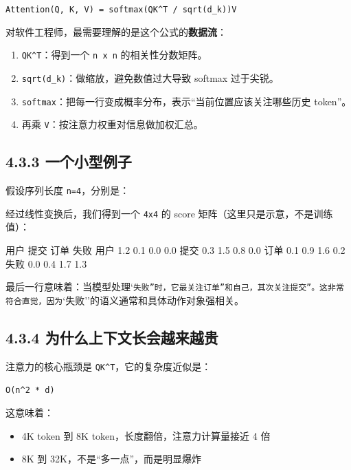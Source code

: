\texttt{Attention(Q, K, V) = softmax(QK\textasciicircum{}T / sqrt(d\_k))V}


对软件工程师，最需要理解的是这个公式的\textbf{数据流}：


\begin{enumerate}[leftmargin=2em]
\item \texttt{QK\textasciicircum{}T}：得到一个 \texttt{n x n} 的相关性分数矩阵。
\item \texttt{sqrt(d\_k)}：做缩放，避免数值过大导致 softmax 过于尖锐。
\item \texttt{softmax}：把每一行变成概率分布，表示``当前位置应该关注哪些历史 token''。
\item 再乘 \texttt{V}：按注意力权重对信息做加权汇总。
\end{enumerate}

\subsection{4.3.3 一个小型例子}

假设序列长度 \texttt{n=4}，分别是：


\begin{codeblock}
["用户", "提交", "订单", "失败"]
\end{codeblock}

经过线性变换后，我们得到一个 \texttt{4x4} 的 score 矩阵（这里只是示意，不是训练值）：


\begin{codeblock}
         用户   提交   订单   失败
用户     1.2   0.1   0.0   0.0
提交     0.3   1.5   0.8   0.0
订单     0.1   0.9   1.6   0.2
失败     0.0   0.4   1.7   1.3
\end{codeblock}

最后一行意味着：当模型处理`\texttt{失败''时，它最关注}\texttt{订单''和自己，其次关注}\texttt{提交''。这非常符合直觉，因为}`失败''的语义通常和具体动作对象强相关。


\subsection{4.3.4 为什么上下文长会越来越贵}

注意力的核心瓶颈是 \texttt{QK\textasciicircum{}T}，它的复杂度近似是：


\texttt{O(n\textasciicircum{}2 * d)}


这意味着：


\begin{itemize}[leftmargin=2em]
\item 4K token 到 8K token，长度翻倍，注意力计算量接近 4 倍
\item 8K 到 32K，不是``多一点''，而是明显爆炸
\end{itemize}

